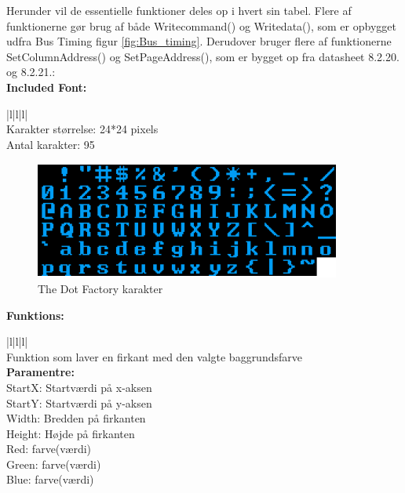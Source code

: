 Herunder vil de essentielle funktioner deles op i hvert sin tabel. Flere af funktionerne gør brug af både Writecommand() og Writedata(), som er opbygget udfra Bus Timing figur \ref{fig:Bus_timing}. Derudover bruger flere af funktionerne SetColumnAddress() og SetPageAddress(), som er bygget op fra datasheet 8.2.20. og 8.2.21.: \\

\newpage
\textbf{\Large Included Font:}

\begin{center}
\begin{tabular}{ |l|l|l| }
\hline
{} \\
\hline
Karakter størrelse: 24*24 pixels  \\
Antal karakter: 95\\
\hline

\end{tabular}
\end{center} 
\begin{figure}[H]
	\centering
	\includegraphics[width = 150 pt]{Img/Thedotfactory.png}
	\caption{The Dot Factory karakter}
	\label{fig:Thedotfactory}
\end{figure}

\textbf{\Large Funktions:}

\begin{center}
\begin{tabular}{ |l|l|l| }
\hline
{} \\
\hline
Funktion som laver en firkant med den valgte baggrundsfarve  \\
\hline
\textbf{Paramentre:}  \\ StartX: Startværdi på x-aksen \\StartY: Startværdi på y-aksen\\ Width: Bredden på firkanten\\ Height: Højde på firkanten\\ Red: farve(værdi)\\ Green: farve(værdi) \\ Blue: farve(værdi)\\
\hline
\end{tabular}
\end{center} 

